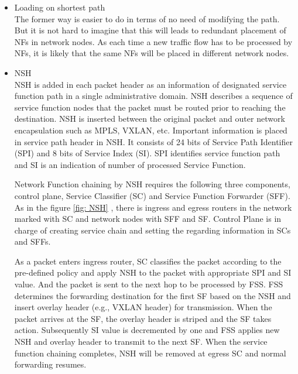 	\begin{itemize}
		\item Loading on shortest path\\
			The former way is easier to do in terms of no need of modifying the path. But it is not hard to imagine that this will leads to redundant placement of NFs in network nodes. As each time a new traffic flow has to be processed by NFs, it is likely that the same NFs will be placed in different network nodes. 
		\item NSH\\
			NSH is added in each packet header as an information of designated service function path in a single administrative domain. NSH describes a sequence of service function nodes that the packet must be routed prior to reaching the destination. NSH is inserted between the original packet and outer network encapsulation such as MPLS, VXLAN, etc. Important information is placed in service path header in NSH. It consists of 24 bits of Service Path Identifier (SPI) and 8 bits of Service Index (SI). SPI identifies service function path and SI is an indication of number of processed Service Function. 
			
			Network Function chaining by NSH requires the following three components, control plane, Service Classifier (SC) and Service Function Forwarder (SFF). As in the figure \ref{fig: NSH} , there is ingress and egress routers in the network marked with SC and network nodes with SFF and SF. Control Plane is in charge of creating service chain and setting the regarding information in SCs and SFFs. 
			
			As a packet enters ingress router, SC classifies the packet according to the pre-defined policy and apply NSH to the packet with appropriate SPI and SI value. And the packet is sent to the next hop to be processed by FSS. FSS determines the forwarding destination for the first SF based on the NSH and insert overlay header (e.g., VXLAN header) for transmission. When the packet arrives at the SF, the overlay header is striped and the SF takes action. Subsequently SI value is decremented by one and FSS applies new NSH and overlay header to transmit to the next SF. When the service function chaining completes, NSH will be removed at egress SC and normal forwarding resumes.   
			

\end{itemize}

